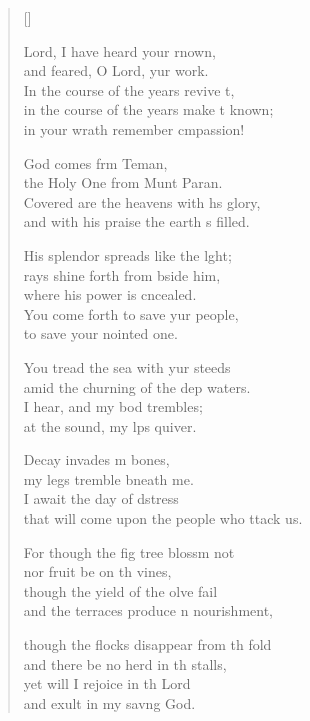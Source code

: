 \settowidth{\versewidth}{that will come upon the people who attack us.}
\begin{verse}[\versewidth]
  \begin{patverse}
 Lord, I have heard your rnown,\Med\\
and feared, O Lord, yur work.\\
In the course of the years revive \pointup{\i}t,\Flex\\
in the course of the years make \pointup{\i}t known;\Med\\
in your wrath remember cmpassion!

God comes frm Teman,\Med\\
the Holy One from Munt Paran.\\
Covered are the heavens with h\pointup{\i}s glory,\Med\\
and with his praise the earth \pointup{\i}s filled.

His splendor spreads like the l\pointup{\i}ght;\Flex\\
rays shine forth from bside him,\Med\\
where his power is cncealed.\\
You come forth to save yur people,\Med\\
to save your nointed one.

You tread the sea with yur steeds\Med\\
amid the churning of the dep waters.\\
I hear, and my bod trembles;\Med\\
at the sound, my l\pointup{\i}ps quiver.

Decay invades m bones,\Med\\
my legs tremble bneath me.\\
I await the day of d\pointup{\i}stress\Med\\
that will come upon the people who ttack us.

For though the fig tree blossm not\Med\\
nor fruit be on th vines,\\
though the yield of the ol\pointup{\i}ve fail\Med\\
and the terraces produce n nourishment,

though the flocks disappear from th fold\Med\\
and there be no herd in th stalls,\\
yet will I rejoice in th Lord\Med\\
and exult in my sav\pointup{\i}ng God.


\end{patverse}
\end{verse}
